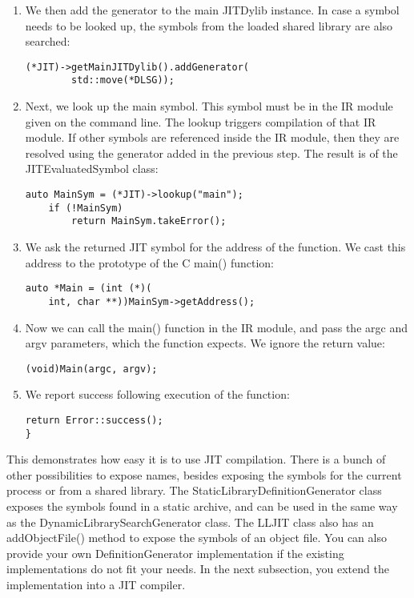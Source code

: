 \begin{enumerate}
\item We then add the generator to the main JITDylib instance. In case a symbol needs to be looked up, the symbols from the loaded shared library are also searched:
\begin{lstlisting}[caption={}]
	(*JIT)->getMainJITDylib().addGenerator(
		std::move(*DLSG));
\end{lstlisting}

\item Next, we look up the main symbol. This symbol must be in the IR module given on the command line. The lookup triggers compilation of that IR module. If other symbols are referenced inside the IR module, then they are resolved using the generator added in the previous step. The result is of the JITEvaluatedSymbol class:
\begin{lstlisting}[caption={}]
	auto MainSym = (*JIT)->lookup("main");
	if (!MainSym)
		return MainSym.takeError();
\end{lstlisting}

\item We ask the returned JIT symbol for the address of the function. We cast this address to the prototype of the C main() function:
\begin{lstlisting}[caption={}]
auto *Main = (int (*)(
	int, char **))MainSym->getAddress();
\end{lstlisting}

\item Now we can call the main() function in the IR module, and pass the argc and argv parameters, which the function expects. We ignore the return value:
\begin{lstlisting}[caption={}]
	(void)Main(argc, argv);
\end{lstlisting}

\item We report success following execution of the function:
\begin{lstlisting}[caption={}]
	return Error::success();
}
\end{lstlisting}

\end{enumerate}

This demonstrates how easy it is to use JIT compilation. There is a bunch of other possibilities to expose names, besides exposing the symbols for the current process or from a shared library. The StaticLibraryDefinitionGenerator class exposes the symbols found in a static archive, and can be used in the same way as the DynamicLibrarySearchGenerator class. The LLJIT class also has an addObjectFile() method to expose the symbols of an object file. You can also provide your own DefinitionGenerator implementation if the existing implementations do not fit your needs. In the next subsection, you extend the implementation into a JIT compiler.\par

